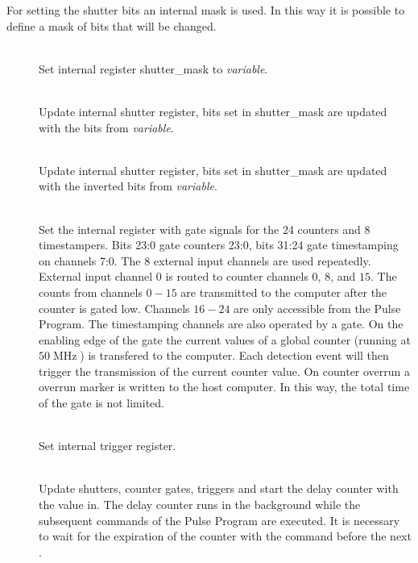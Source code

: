 \documentclass[11pt]{scrartcl}
\newcommand{\unit}[1]{\ensuremath{\operatorname{#1}}}
\begin{document}
For setting the shutter bits an internal mask is used. In this way it is possible to define a mask of bits that will be changed.
\begin{addmargin}{1cm}
\begin{description}
\item[ ]  \hfill\\  
Set internal register shutter\_mask to {\it variable}.

\item[ ]  \hfill\\  
Update internal shutter register, bits set in shutter\_mask are updated with the bits from {\it variable}.

\item[ ]  \hfill\\  
Update internal shutter register, bits set in shutter\_mask are updated with the inverted bits from {\it variable}.

\item[ ]  \hfill\\  
Set the internal register with gate signals for the 24 counters and 8 timestampers. Bits 23:0 gate counters 23:0, bits 31:24 gate  timestamping on channels 7:0. The $8$ external input channels are used repeatedly. External input channel $0$ is routed to counter channels $0$, $8$, and $15$. The counts from channels $0 - 15$ are transmitted to the computer after the counter is gated low. Channels $16-24$ are only accessible from the Pulse Program. The timestamping channels are also operated by a gate. On the enabling edge of the gate the current values of a global counter (running at $50\unit{MHz}$) is transfered to the computer. Each detection event will then trigger the transmission of the current counter value. On counter overrun a overrun marker is written to the host computer. In this way, the total time of the gate is not limited.

\item[ ] \hfill\\   
Set internal trigger register.

\item[  ]  \hfill\\  
Update shutters, counter gates, triggers and start the delay counter with the value in. The delay counter runs in the background while the subsequent commands of the Pulse Program are executed. It is necessary to wait for the expiration of the counter with the  command before the next .


\end{description}
\end{addmargin}
\end{document}
